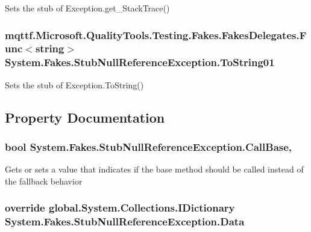 Sets the stub of Exception.\-get\-\_\-\-Stack\-Trace()

\hypertarget{class_system_1_1_fakes_1_1_stub_null_reference_exception_ac90d792f27ebf095fb5ad5e9243e17f1}{
\subsubsection[{To\-String01}]{\setlength{\rightskip}{0pt plus 5cm}mqttf.\-Microsoft.\-Quality\-Tools.\-Testing.\-Fakes.\-Fakes\-Delegates.\-Func$<$string$>$ System.\-Fakes.\-Stub\-Null\-Reference\-Exception.\-To\-String01}}\label{class_system_1_1_fakes_1_1_stub_null_reference_exception_ac90d792f27ebf095fb5ad5e9243e17f1}


Sets the stub of Exception.\-To\-String()



\subsection{Property Documentation}
\hypertarget{class_system_1_1_fakes_1_1_stub_null_reference_exception_a169ddc2452a5a4b72bea8691a6612e0c}{
\subsubsection[{Call\-Base}]{\setlength{\rightskip}{0pt plus 5cm}bool System.\-Fakes.\-Stub\-Null\-Reference\-Exception.\-Call\-Base\hspace{0.3cm}{\ttfamily [get]}, {\ttfamily [set]}}}\label{class_system_1_1_fakes_1_1_stub_null_reference_exception_a169ddc2452a5a4b72bea8691a6612e0c}


Gets or sets a value that indicates if the base method should be called instead of the fallback behavior

\hypertarget{class_system_1_1_fakes_1_1_stub_null_reference_exception_ae85f6ece183338e324e72fdcb5cdfff6}{
\subsubsection[{Data}]{\setlength{\rightskip}{0pt plus 5cm}override global.\-System.\-Collections.\-I\-Dictionary System.\-Fakes.\-Stub\-Null\-Reference\-Exception.\-Data\hspace{0.3cm}{\ttfamily [get]}}}\label{class_system_1_1_fakes_1_1_stub_null_reference_exception_ae85f6ece183338e324e72fdcb5cdfff6}


